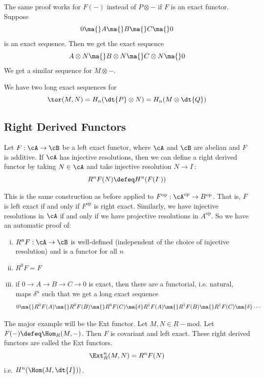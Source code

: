 The same proof works for $F(-)$ instead of $P \otimes -$ if $F$ is an exact functor. Suppose
\[
0 \ma{} A \ma{} B \ma{} C \ma{} 0
\]
is an exact sequence. Then we get the exact sequence
\[
A \otimes N \ma{} B \otimes N \ma{} C \otimes N \ma{} 0
\]
We get a similar sequence for $M \otimes -$. 

\begin{cor}
We have two long exact sequences for
\[
\tor(M,N)=H_n(\dt{P} \otimes N) = H_n(M \otimes \dt{Q})
\]
\end{cor}

\subsection{Right Derived Functors}

\begin{dfn}
Let $F: \cA \to \cB$ be a left exact functor, where $\cA$ and $\cB$ are abelian and $F$ is additive. If $\cA$ has injective resolutions, then we can define a right derived functor by taking $N \in \cA$ and take injective resolution $N \to I^{\cdot}$:
\[
R^nF(N) \defeq H^n(F(I^{\cdot}))
\]
\end{dfn}

This is the same construction as before applied to $F^{\text{op}}: \cA^{\text{op}} \to B^{\text{op}}$. That is, $F$ is left exact if and only if $F^{\text{op}}$ is right exact. Similarly, we have injective resolutions in $\cA$ if and only if we have projective resolutions in $A^\text{op}$. So we have an automatic proof of:

\begin{thm}
\begin{enumerate}[(i)]
\item $R^nF: \cA \to \cB$ is well-defined (independent of the choice of injective resolution) and is a functor for all $n$
\item $R^0F=F$
\item if $0 \to A \to B \to C \to 0$ is exact, then there are a functorial, i.e. natural, maps $\delta^n$ such that we get a long exact sequence
\[
0 \ma{} R^0F(A) \ma{} R^0F(B) \ma{} R^0F(C) \ma{\delta} R^1F(A) \ma{} R^1F(B) \ma{} R^1F(C) \ma{\delta} \cdots
\]
\end{enumerate}
\end{thm}

The major example will be the Ext functor. Let $M,N \in R-\text{mod}$. Let $F(-)\defeq \Hom_R(M,-)$. Then $F$ is covariant and left exact. These right derived functors are called the Ext functors.
\[
\Ext_R^n(M,N)=R^nF(N)
\]
i.e. $H^n(\Hom(M,\dt{I}))$. 

